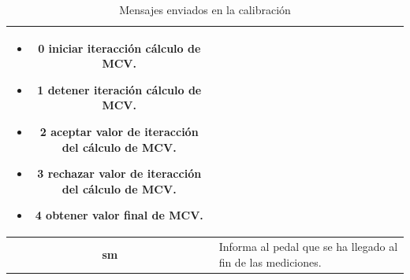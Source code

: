 \begin{table}[ht]
\begin{tabular}{ |c|p{14cm}|}
\begin{minipage}{14cm}
\begin{itemize}
                                    \begin{itemize}
                                        \item 0 iniciar iteracción cálculo de MCV.
                                        \item 1 detener iteración cálculo de MCV.
                                        \item 2 aceptar valor de iteracción del cálculo de MCV.
                                        \item 3 rechazar valor de iteracción del cálculo de MCV.
                                        \item 4 obtener valor final de MCV.
                                    \end{itemize}
                                \end{itemize} 
                                \vspace{1pt}
                            \end{minipage}\\\hline
        \textbf{sm}     &   Informa al pedal que se ha llegado al fin de las mediciones. \\\hline               

    \end{tabular}
    \caption{Mensajes enviados en la calibración}
    \label{table:send-msg-in-calibration}
\end{table}  

